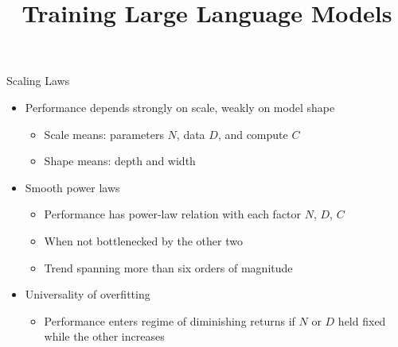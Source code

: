 



\newcommand{\learninggoals}{
\item Understand Chinchilla
\item Understand the various scaling laws
}
\def\myblue#1{\textcolor{texblue}{#1}}

\title{Training Large Language Models}
\date{}







\begin{vbframe}{Scaling Laws}
\href{https://arxiv.org/abs/2001.08361}{} 

\vfill

\begin{itemize}

	\item Performance depends strongly on scale, weakly on model shape
	\begin{itemize}
	\item Scale means: parameters $N$, data $D$, and compute $C$
	\item Shape means: depth and width
	\end{itemize}

	\item Smooth power laws
	\begin{itemize}
	\item Performance has power-law relation with each factor $N$, $D$, $C$
	\item When not bottlenecked by the other two 
	\item Trend spanning more than six orders of magnitude
	\end{itemize}

	\item Universality of overfitting 
	\begin{itemize}
	\item Performance enters regime of diminishing returns if $N$ or $D$ held fixed while the other increases
	\end{itemize}

\end{itemize}

\vfill

\end{vbframe}

